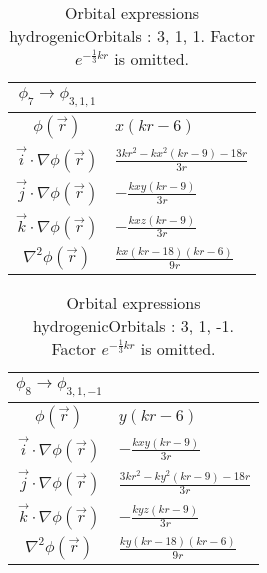 \begin{table}
\begin{center}
\begin{tabular}{c|l}
$\phi_{7} \rightarrow \phi_{3, 1, 1}$\\
\hline
$\phi(\vec r)$ & $x \left(k r -6\right)$\\
\hline
$\vec i\cdot \nabla \phi(\vec r)$ & $\frac{3 k r^{2} - k x^{2} \left(k r -9\right) - 18 r}{3 r}$\\
$\vec j\cdot \nabla \phi(\vec r)$ & $- \frac{k x y \left(k r -9\right)}{3 r}$\\
$\vec k\cdot \nabla \phi(\vec r)$ & $- \frac{k x z \left(k r -9\right)}{3 r}$\\
\hline
$\nabla^2 \phi(\vec r)$ & $\frac{k x \left(k r -18\right) \left(k r -6\right)}{9 r}$\\
\end{tabular}
\caption{Orbital expressions hydrogenicOrbitals : 3, 1, 1. Factor $e^{- \frac{1}{3} k r}$ is omitted.}
\end{center}
\end{table}

\clearpage

\begin{table}
\begin{center}
\begin{tabular}{c|l}
$\phi_{8} \rightarrow \phi_{3, 1, -1}$\\
\hline
$\phi(\vec r)$ & $y \left(k r -6\right)$\\
\hline
$\vec i\cdot \nabla \phi(\vec r)$ & $- \frac{k x y \left(k r -9\right)}{3 r}$\\
$\vec j\cdot \nabla \phi(\vec r)$ & $\frac{3 k r^{2} - k y^{2} \left(k r -9\right) - 18 r}{3 r}$\\
$\vec k\cdot \nabla \phi(\vec r)$ & $- \frac{k y z \left(k r -9\right)}{3 r}$\\
\hline
$\nabla^2 \phi(\vec r)$ & $\frac{k y \left(k r -18\right) \left(k r -6\right)}{9 r}$\\
\end{tabular}
\caption{Orbital expressions hydrogenicOrbitals : 3, 1, -1. Factor $e^{- \frac{1}{3} k r}$ is omitted.}
\end{center}
\end{table}


